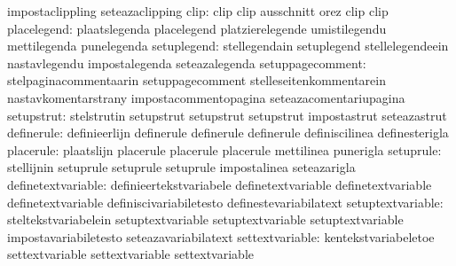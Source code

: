                                   impostaclippling                 seteazaclipping %
                            clip: clip                             clip
                                  ausschnitt                       orez
                                  clip                             clip
                     placelegend: plaatslegenda                    placelegend
                                  platzierelegende                 umistilegendu
                                  mettilegenda                     punelegenda
                     setuplegend: stellegendain                    setuplegend
                                  stellelegendeein                 nastavlegendu
                                  impostalegenda                   seteazalegenda
                setuppagecomment: stelpaginacommentaarin           setuppagecomment
                                  stelleseitenkommentarein         nastavkomentarstrany
                                  impostacommentopagina            seteazacomentariupagina
                      setupstrut: stelstrutin                      setupstrut
                                  setupstrut                       setupstrut
                                  impostastrut                     seteazastrut
                      definerule: definieerlijn                    definerule
                                  definerule                       definerule
                                  definiscilinea                   definesterigla
                       placerule: plaatslijn                       placerule
                                  placerule                        placerule
                                  mettilinea                       punerigla
                       setuprule: stellijnin                       setuprule
                                  setuprule                        setuprule
                                  impostalinea                     seteazarigla
              definetextvariable: definieertekstvariabele          definetextvariable
                                  definetextvariable               definetextvariable
                                  definiscivariabiletesto          definestevariabilatext
               setuptextvariable: steltekstvariabelein             setuptextvariable
                                  setuptextvariable                setuptextvariable
                                  impostavariabiletesto            seteazavariabilatext
                 settextvariable: kentekstvariabeletoe             settextvariable
                                  settextvariable                  settextvariable
